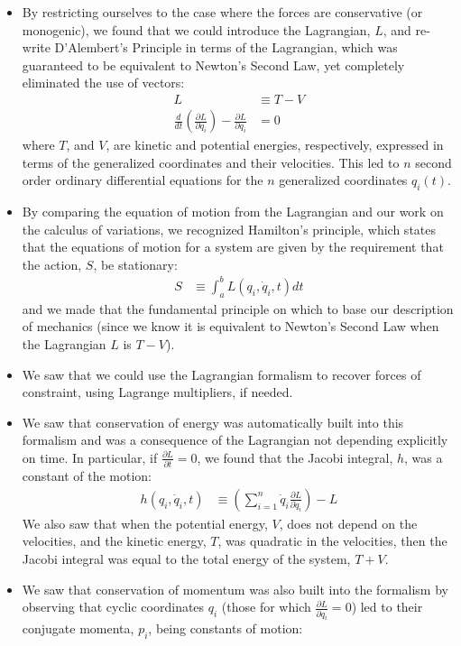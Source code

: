 \documentclass[10pt]{report}
\newcommand{\die}[2]{\frac{\partial #1}{\partial #2}}
\begin{document}
\begin{itemize}
\begin{align*}
\frac{d}{dt}\left(\frac{\partial T}{\partial \dot{q}_j} \right) - \frac{\partial T}{\partial q_j}=Q_j
\end{align*}
\item By restricting ourselves to the case where the forces are conservative (or monogenic), we found that we could introduce the Lagrangian, $L$, and re-write D'Alembert's Principle in terms of the Lagrangian, which was guaranteed to be equivalent to Newton's Second Law, yet completely eliminated the use of vectors:
\begin{align*}
L&\equiv T - V \\
\frac{d}{dt}\left(\frac{\partial L}{\partial \dot{q}_i}\right)-\frac{\partial L}{\partial q_i}&=0 
\end{align*}
where $T$, and $V$, are kinetic and potential energies, respectively, expressed in terms of the generalized coordinates and their velocities. This led to $n$ second order ordinary differential equations for the $n$ generalized coordinates $q_i(t)$.
\item By comparing the equation of motion from the Lagrangian and our work on the calculus of variations, we recognized Hamilton's principle, which states that the equations of motion for a system are given by the requirement that the action, $S$, be stationary:
\begin{align*}
S&\equiv \int_a^b L(q_i,\dot q_i, t)dt
\end{align*}
and we made that the fundamental principle on which to base our description of mechanics (since we know it is equivalent to Newton's Second Law when the Lagrangian $L$ is $T-V$).
\item We saw that we could use the Lagrangian formalism to recover forces of constraint, using Lagrange multipliers, if needed.
\item We saw that conservation of energy was automatically built into this formalism and was a consequence of the Lagrangian not depending explicitly on time. In particular, if $\die{L}{t}=0$, we found that the Jacobi integral, $h$, was a constant of the motion:
\begin{align*}
h(q_i, \dot{q}_i, t)&\equiv \left(\sum_{i=1}^n \dot{q}_i\frac{\partial L}{\partial \dot{q}_i}\right) -L
\end{align*}
We also saw that when the potential energy, $V$, does not depend on the velocities, and the kinetic energy, $T$, was quadratic in the velocities, then the Jacobi integral was equal to the total energy of the system, $T+V$.
\item We saw that conservation of momentum was also built into the formalism by observing that cyclic coordinates $q_i$ (those for which $\die{L}{q_i}=0$) led to their conjugate momenta, $p_i$, being constants of motion:

\end{itemize}
\end{document}
